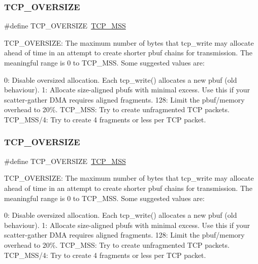 \subsubsection{\texorpdfstring{T\+C\+P\+\_\+\+O\+V\+E\+R\+S\+I\+ZE}{TCP\_OVERSIZE}\hspace{0.1cm}{\footnotesize\ttfamily [1/2]}}
{\footnotesize\ttfamily \#define T\+C\+P\+\_\+\+O\+V\+E\+R\+S\+I\+ZE~\hyperlink{group__lwip__opts__tcp_gaf1ab7bb27860aa3677c387a2f3ba317b}{T\+C\+P\+\_\+\+M\+SS}}

T\+C\+P\+\_\+\+O\+V\+E\+R\+S\+I\+ZE\+: The maximum number of bytes that tcp\+\_\+write may allocate ahead of time in an attempt to create shorter pbuf chains for transmission. The meaningful range is 0 to T\+C\+P\+\_\+\+M\+SS. Some suggested values are\+:

0\+: Disable oversized allocation. Each tcp\+\_\+write() allocates a new pbuf (old behaviour). 1\+: Allocate size-\/aligned pbufs with minimal excess. Use this if your scatter-\/gather D\+MA requires aligned fragments. 128\+: Limit the pbuf/memory overhead to 20\%. T\+C\+P\+\_\+\+M\+SS\+: Try to create unfragmented T\+CP packets. T\+C\+P\+\_\+\+M\+S\+S/4\+: Try to create 4 fragments or less per T\+CP packet. \mbox{\label{group__lwip__opts__tcp_ga5648e2580bb55c0efdfbebcf3bad1eef}} 
\subsubsection{\texorpdfstring{T\+C\+P\+\_\+\+O\+V\+E\+R\+S\+I\+ZE}{TCP\_OVERSIZE}\hspace{0.1cm}{\footnotesize\ttfamily [2/2]}}
{\footnotesize\ttfamily \#define T\+C\+P\+\_\+\+O\+V\+E\+R\+S\+I\+ZE~\hyperlink{group__lwip__opts__tcp_gaf1ab7bb27860aa3677c387a2f3ba317b}{T\+C\+P\+\_\+\+M\+SS}}

T\+C\+P\+\_\+\+O\+V\+E\+R\+S\+I\+ZE\+: The maximum number of bytes that tcp\+\_\+write may allocate ahead of time in an attempt to create shorter pbuf chains for transmission. The meaningful range is 0 to T\+C\+P\+\_\+\+M\+SS. Some suggested values are\+:

0\+: Disable oversized allocation. Each tcp\+\_\+write() allocates a new pbuf (old behaviour). 1\+: Allocate size-\/aligned pbufs with minimal excess. Use this if your scatter-\/gather D\+MA requires aligned fragments. 128\+: Limit the pbuf/memory overhead to 20\%. T\+C\+P\+\_\+\+M\+SS\+: Try to create unfragmented T\+CP packets. T\+C\+P\+\_\+\+M\+S\+S/4\+: Try to create 4 fragments or less per T\+CP packet. \mbox{\label{group__lwip__opts__tcp_ga89ffd0d7d1529bdb26bfbad267d0ad75}} 

